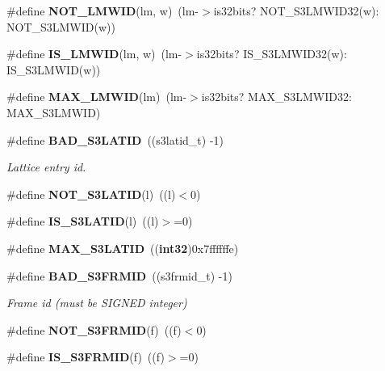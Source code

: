 \begin{DoxyCompactItemize}
\item 
\#define {\bfseries \-N\-O\-T\-\_\-\-L\-M\-W\-I\-D}(lm, w)~(lm-\/$>$is32bits? \-N\-O\-T\-\_\-\-S3\-L\-M\-W\-I\-D32(w)\-: \-N\-O\-T\-\_\-\-S3\-L\-M\-W\-I\-D(w))\label{s3types_8h_ac880fc8b5db83b81513b43ec8db121e0}

\item 
\#define {\bfseries \-I\-S\-\_\-\-L\-M\-W\-I\-D}(lm, w)~(lm-\/$>$is32bits? \-I\-S\-\_\-\-S3\-L\-M\-W\-I\-D32(w)\-: \-I\-S\-\_\-\-S3\-L\-M\-W\-I\-D(w))\label{s3types_8h_a5575e741f21ef511fd4ee70fc5cbd6b3}

\item 
\#define {\bfseries \-M\-A\-X\-\_\-\-L\-M\-W\-I\-D}(lm)~(lm-\/$>$is32bits? \-M\-A\-X\-\_\-\-S3\-L\-M\-W\-I\-D32\-: \-M\-A\-X\-\_\-\-S3\-L\-M\-W\-I\-D)\label{s3types_8h_ad3a57931b80d8ac88424201e45a07ebc}

\item 
\#define {\bf \-B\-A\-D\-\_\-\-S3\-L\-A\-T\-I\-D}~((s3latid\-\_\-t) -\/1)\label{s3types_8h_a4dc7d8594d7789aef5ca7dd2ec2e6d85}

\begin{DoxyCompactList}\small\item\em \-Lattice entry id. \end{DoxyCompactList}\item 
\#define {\bfseries \-N\-O\-T\-\_\-\-S3\-L\-A\-T\-I\-D}(l)~((l)$<$0)\label{s3types_8h_a2899476244b1a12c9813bb366b5061fc}

\item 
\#define {\bfseries \-I\-S\-\_\-\-S3\-L\-A\-T\-I\-D}(l)~((l)$>$=0)\label{s3types_8h_ada5024b91faf1b97c7fa04adf2f51d13}

\item 
\#define {\bfseries \-M\-A\-X\-\_\-\-S3\-L\-A\-T\-I\-D}~(({\bf int32})0x7ffffffe)\label{s3types_8h_af30e82546f464c726f01cc0b17b7eebf}

\item 
\#define {\bf \-B\-A\-D\-\_\-\-S3\-F\-R\-M\-I\-D}~((s3frmid\-\_\-t) -\/1)\label{s3types_8h_a564e6d8072efdbd932b413007e4897c1}

\begin{DoxyCompactList}\small\item\em \-Frame id (must be \-S\-I\-G\-N\-E\-D integer) \end{DoxyCompactList}\item 
\#define {\bfseries \-N\-O\-T\-\_\-\-S3\-F\-R\-M\-I\-D}(f)~((f)$<$0)\label{s3types_8h_a7bd95ea9e40790c7d9d1917c121ed432}

\item 
\#define {\bfseries \-I\-S\-\_\-\-S3\-F\-R\-M\-I\-D}(f)~((f)$>$=0)\label{s3types_8h_a903531cb550f4258304dac0a9fea160b}


\end{DoxyCompactItemize}
